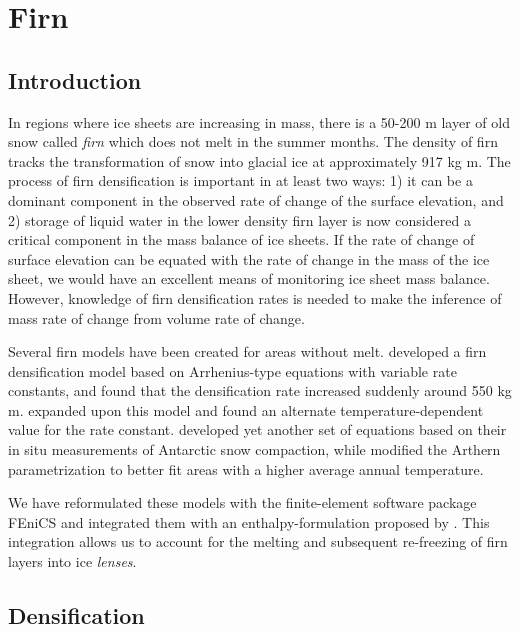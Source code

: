 
\chapter{Firn}

\section{Introduction}


In regions where ice sheets are increasing in mass, there is a 50-200 m layer of old snow called \emph{firn} which does not melt in the summer months.  The density of firn tracks the transformation of snow into glacial ice at approximately 917 kg m.  The process of firn densification is important in at least two ways: 1) it can be a dominant component in the observed rate of change of the surface elevation, and 2) storage of liquid water in the lower density firn layer is now considered a critical component in the mass balance of ice sheets.  If the rate of change of surface elevation can be equated with the rate of change in the mass of the ice sheet, we would have an excellent means of monitoring ice sheet mass balance.  However, knowledge of firn densification rates is needed to make the inference of mass rate of change from volume rate of change.

Several firn models have been created for areas without melt.  \citet{herron_1980} developed a firn densification model based on Arrhenius-type equations with variable rate constants, and found that the densification rate increased suddenly around 550 kg m.  \citep{zwally_2002} expanded upon this model and found an alternate temperature-dependent value for the rate constant.  \citet{arthern_2010} developed yet another set of equations based on their in situ measurements of Antarctic snow compaction, while \citet{ligtenberg_2011} modified the Arthern parametrization to better fit areas with a higher average annual temperature. 

We have reformulated these models with the finite-element software package FEniCS and integrated them with an enthalpy-formulation proposed by \citet{aschwanden_2012}.  This integration allows us to account for the melting and subsequent re-freezing of firn layers into ice \emph{lenses}.  


\section{Densification}

